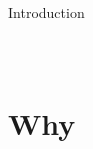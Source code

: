 \documentclass{beamer}
\begin{document}
\begin{frame}{Introduction}
\begin{columns}
\begin{figure}
			\end{figure}
		\end{columns}
	\end{frame}
	
	

%
%

%		
%	


	\section{Why}
	
\end{document}
